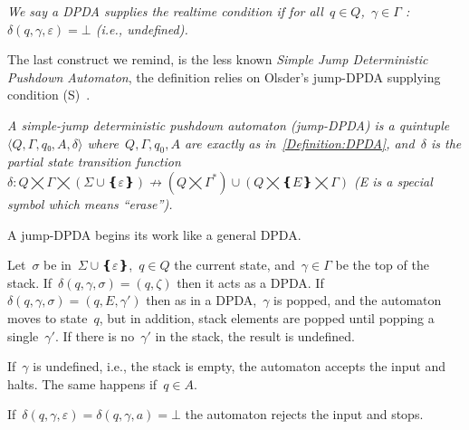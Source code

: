 \begin{Definition}
  \label{Definition:realtime}
  \slshape
We say a DPDA supplies the \emph{realtime condition} if 
  for all~$q∈Q$,~$γ∈Γ$ :~$δ(q,γ,ε)=⊥$ (i.e., undefined).
\end{Definition}
% 

The last construct we remind, is the less known \emph{Simple Jump Deterministic Pushdown Automaton},
the definition relies on Olsder's jump-DPDA supplying condition (S)~\cite{Olsder:05}.

\begin{Definition}
  \label{Definition:JDPDA}
  \slshape
  A \emph{simple-jump deterministic pushdown automaton} (jump-DPDA) is a quintuple~$⟨Q,Γ,q₀,A,δ⟩$
  where~$Q,\Gamma,q_0,A$ are exactly as in~\cref{Definition:DPDA},
  and~$δ$ is the 
  \emph{partial state transition function}~$δ:Q⨉Γ⨉(Σ∪❴ε❵)↛(Q⨉Γ^*)∪(Q⨉❴E❵⨉Γ)$
  (E is a special symbol which means ``erase'').
  \par
  A jump-DPDA begins its work like a general DPDA\@. 
  \par
  Let~$σ$ be in~$Σ∪❴ε❵$,~$q∈Q$ the current state, and~$γ∈Γ$ be the top of the stack. 
  If~$δ(q,γ,σ)=(q,ζ)$ then it acts as a DPDA.
  If~$δ(q,γ,σ)=(q,E,γ')$ then as in a DPDA,~$γ$ is popped, and the automaton
  moves to state~$q$, but in addition, stack elements are popped until
  popping a single~$γ'$. 
  If there is no~$γ'$ in the stack, the result is undefined.
  \par
  If~$γ$ is undefined, i.e., the stack is empty, the automaton accepts the input and halts.
  The same happens if~$q∈A$.
  \par
  If~$δ(q,γ,ε)=δ(q,γ,a)=⊥$ the automaton rejects the input and stops.
\end{Definition}

